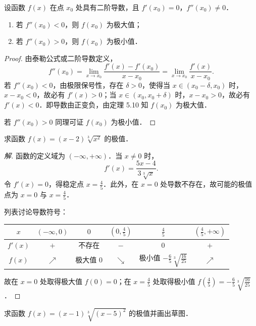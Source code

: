 \begin{theorem}[极值第二充分条件]\label{thm:5-11}
设函数 $f(x)$ 在点 $x_{0}$ 处具有二阶导数，且 $f'(x_{0})=0$，$f''(x_{0})\neq0$．
\begin{enumerate}[(1)]
\item 若 $f''(x_{0})<0$，则 $f(x_{0})$ 为极大值；
\item 若 $f''(x_{0})>0$，则 $f(x_{0})$ 为极小值．
\end{enumerate}
\end{theorem}

\begin{proof}
由泰勒公式或二阶导数定义，
\[
f''(x_0) = \lim_{x\to x_0} \frac{f'(x) - f'(x_0)}{x - x_0} = \lim_{x\to x_0} \frac{f'(x)}{x - x_0}.
\]
若 $f''(x_0) < 0$，由极限保号性，存在 $\delta > 0$，使得当 $x \in (x_0 - \delta, x_0)$ 时，$x - x_0 < 0$，故必有 $f'(x) > 0$；当 $x \in (x_0, x_0 + \delta)$ 时，$x - x_0 > 0$，故必有 $f'(x) < 0$．即导数由正变负，由定理 5.10 知 $f(x_0)$ 为极大值．

若 $f''(x_0) > 0$ 同理可证 $f(x_0)$ 为极小值．
\end{proof}

\begin{example}
求函数 $f(x) = (x-2)\sqrt[3]{x^2}$ 的极值．
\end{example}

\begin{proof}[解]
函数的定义域为 $(-\infty, +\infty)$．当 $x \neq 0$ 时，
\[
f'(x) = \frac{5x - 4}{3\sqrt[3]{x}}.
\]
令 $f'(x) = 0$，得稳定点 $x = \frac{4}{5}$．此外，在 $x = 0$ 处导数不存在，故可能的极值点为 $x = 0$ 与 $x = \frac{4}{5}$．

列表讨论导数符号：
\begin{center}
\begin{tabular}{c|c|c|c|c|c}
\toprule
$x$ & $(-\infty, 0)$ & $0$ & $(0, \frac{4}{5})$ & $\frac{4}{5}$ & $(\frac{4}{5}, +\infty)$ \\
\midrule
$f'(x)$ & $+$ & 不存在 & $-$ & $0$ & $+$ \\
$f(x)$ & $\nearrow$ & 极大值 $0$ & $\searrow$ & 极小值 $-\frac{6}{5}\sqrt[3]{\frac{16}{25}}$ & $\nearrow$ \\
\bottomrule
\end{tabular}
\end{center}
故在 $x = 0$ 处取得极大值 $f(0) = 0$；在 $x = \frac{4}{5}$ 处取得极小值 $f(\frac{4}{5}) = -\frac{6}{5}\sqrt[3]{\frac{16}{25}}$．
\end{proof}

\begin{example}
求函数 $f(x) = (x-1)\sqrt[3]{(x-5)^2}$ 的极值并画出草图．
\end{example}

